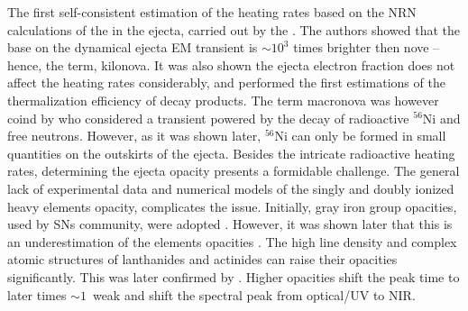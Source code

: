 The first self-consistent estimation of the heating rates based on the \ac{NRN} calculations 
of the \rproc{} in the ejecta, carried out by the \citet{Metzger:2010}. The authors showed that the base 
on the dynamical ejecta \ac{EM} transient is $\sim10^3$ times brighter then nove -- hence, the term, kilonova. 
It was also shown the ejecta electron fraction does not affect the heating rates considerably, 
and performed the first estimations of the thermalization efficiency of decay products. 
%
The term macronova was however coind by \citet{Kulkarni:2005jw} who considered a transient powered by the 
decay of radioactive $^{56}$Ni and free neutrons. However, as it was shown later, $^{56}$Ni can only be 
formed in small quantities on the outskirts of the ejecta.
%
Besides the intricate radioactive heating rates, determining the ejecta opacity presents a 
formidable challenge. The general lack of experimental data and numerical models of the singly 
and doubly ionized heavy \rproc{} elements opacity, complicates the issue. Initially, gray iron 
group opacities, used by \acp{SN} community, were adopted \citep{Roberts:2011}. However, it was 
shown later that this is an underestimation of the \rproc{} elements opacities \citep{Kasen:2013xka}. 
The high line density and complex atomic structures of lanthanides and actinides can raise their 
opacities significantly. This was later confirmed by \citep{Tanaka:2013ana}. Higher opacities shift 
the peak time to later times ${\sim}1$~weak \citep{Barnes:2013wka} 
and shift the spectral peak from optical/UV to \ac{NIR}.



